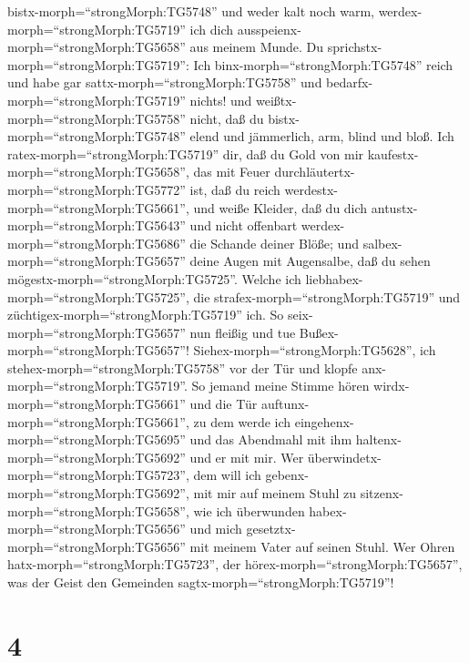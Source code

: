 bistx-morph=``strongMorph:TG5748'' und weder kalt noch warm,
werdex-morph=``strongMorph:TG5719'' ich dich
ausspeienx-morph=``strongMorph:TG5658'' aus meinem Munde. 
Du sprichstx-morph=``strongMorph:TG5719'': Ich
binx-morph=``strongMorph:TG5748'' reich und habe gar
sattx-morph=``strongMorph:TG5758'' und
bedarfx-morph=``strongMorph:TG5719'' nichts! und
weißtx-morph=``strongMorph:TG5758'' nicht, daß du
bistx-morph=``strongMorph:TG5748'' elend und jämmerlich, arm, blind und
bloß.  Ich ratex-morph=``strongMorph:TG5719'' dir, daß du
Gold von mir kaufestx-morph=``strongMorph:TG5658'', das mit Feuer
durchläutertx-morph=``strongMorph:TG5772'' ist, daß du reich
werdestx-morph=``strongMorph:TG5661'', und weiße Kleider, daß du dich
antustx-morph=``strongMorph:TG5643'' und nicht offenbart
werdex-morph=``strongMorph:TG5686'' die Schande deiner Blöße; und
salbex-morph=``strongMorph:TG5657'' deine Augen mit Augensalbe, daß du
sehen mögestx-morph=``strongMorph:TG5725''.  Welche ich
liebhabex-morph=``strongMorph:TG5725'', die
strafex-morph=``strongMorph:TG5719'' und
züchtigex-morph=``strongMorph:TG5719'' ich. So
seix-morph=``strongMorph:TG5657'' nun fleißig und tue
Bußex-morph=``strongMorph:TG5657''! 
Siehex-morph=``strongMorph:TG5628'', ich
stehex-morph=``strongMorph:TG5758'' vor der Tür und klopfe
anx-morph=``strongMorph:TG5719''. So jemand meine Stimme hören
wirdx-morph=``strongMorph:TG5661'' und die Tür
auftunx-morph=``strongMorph:TG5661'', zu dem werde ich
eingehenx-morph=``strongMorph:TG5695'' und das Abendmahl mit ihm
haltenx-morph=``strongMorph:TG5692'' und er mit mir.  Wer
überwindetx-morph=``strongMorph:TG5723'', dem will ich
gebenx-morph=``strongMorph:TG5692'', mit mir auf meinem Stuhl zu
sitzenx-morph=``strongMorph:TG5658'', wie ich überwunden
habex-morph=``strongMorph:TG5656'' und mich
gesetztx-morph=``strongMorph:TG5656'' mit meinem Vater auf seinen Stuhl.
 Wer Ohren hatx-morph=``strongMorph:TG5723'', der
hörex-morph=``strongMorph:TG5657'', was der Geist den Gemeinden
sagtx-morph=``strongMorph:TG5719''!

\hypertarget{section-3}{%
\section{4}\label{section-3}}

